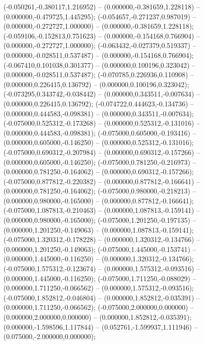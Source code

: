  (-0.050261,-0.380117,1.216952) -- (0.000000,-0.381659,1.228118) -- (0.000000,-0.479725,1.445295);
 (-0.054657,-0.271237,0.987019) -- (0.000000,-0.272727,1.000000) -- (0.000000,-0.381659,1.228118);
 (-0.059106,-0.152813,0.751623) -- (0.000000,-0.154168,0.766904) -- (0.000000,-0.272727,1.000000);
 (-0.063432,-0.027379,0.519337) -- (0.000000,-0.028511,0.537487) -- (0.000000,-0.154168,0.766904);
 (-0.067410,0.101038,0.301377) -- (0.000000,0.100196,0.323042) -- (0.000000,-0.028511,0.537487);
 (-0.070785,0.226936,0.110908) -- (0.000000,0.226415,0.136792) -- (0.000000,0.100196,0.323042);
 (-0.073295,0.343742,-0.038442) -- (0.000000,0.343511,-0.007634) -- (0.000000,0.226415,0.136792);
 (-0.074722,0.444623,-0.134736) -- (0.000000,0.444583,-0.098381) -- (0.000000,0.343511,-0.007634);
 (-0.075000,0.525312,-0.173268) -- (0.000000,0.525312,-0.131016) -- (0.000000,0.444583,-0.098381);
 (-0.075000,0.605000,-0.193416) -- (0.000000,0.605000,-0.146250) -- (0.000000,0.525312,-0.131016);
 (-0.075000,0.690312,-0.207984) -- (0.000000,0.690312,-0.157266) -- (0.000000,0.605000,-0.146250);
 (-0.075000,0.781250,-0.216973) -- (0.000000,0.781250,-0.164062) -- (0.000000,0.690312,-0.157266);
 (-0.075000,0.877812,-0.220382) -- (0.000000,0.877812,-0.166641) -- (0.000000,0.781250,-0.164062);
 (-0.075000,0.980000,-0.218213) -- (0.000000,0.980000,-0.165000) -- (0.000000,0.877812,-0.166641);
 (-0.075000,1.087813,-0.210463) -- (0.000000,1.087813,-0.159141) -- (0.000000,0.980000,-0.165000);
 (-0.075000,1.201250,-0.197135) -- (0.000000,1.201250,-0.149063) -- (0.000000,1.087813,-0.159141);
 (-0.075000,1.320312,-0.178228) -- (0.000000,1.320312,-0.134766) -- (0.000000,1.201250,-0.149063);
 (-0.075000,1.445000,-0.153741) -- (0.000000,1.445000,-0.116250) -- (0.000000,1.320312,-0.134766);
 (-0.075000,1.575312,-0.123674) -- (0.000000,1.575312,-0.093516) -- (0.000000,1.445000,-0.116250);
 (-0.075000,1.711250,-0.088029) -- (0.000000,1.711250,-0.066562) -- (0.000000,1.575312,-0.093516);
 (-0.075000,1.852812,-0.046804) -- (0.000000,1.852812,-0.035391) -- (0.000000,1.711250,-0.066562);
 (-0.075000,2.000000,0.000000) -- (0.000000,2.000000,0.000000) -- (0.000000,1.852812,-0.035391);
 (0.000000,-1.598596,1.117844) -- (0.052761,-1.599937,1.111946) -- (0.075000,-2.000000,0.000000);
